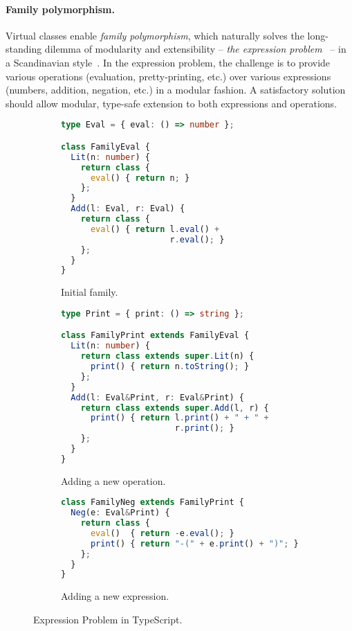 \paragraph{Family polymorphism.}
Virtual classes enable \emph{family polymorphism}, which naturally solves the
long-standing dilemma of modularity and extensibility -- \emph{the expression
problem}~\citep{wadler1998expression} -- in a Scandinavian
style~\citep{ernst2004expression}. In the expression problem, the challenge is
to provide various operations (evaluation, pretty-printing, etc.) over various
expressions (numbers, addition, negation, etc.) in a modular fashion. A
satisfactory solution should allow modular, type-safe extension to both
expressions and operations.

\begin{figure}
\begin{subfigure}{.5\textwidth}
\begin{lstlisting}[language=TypeScript,basicstyle=\ttfamily\footnotesize]
type Eval = { eval: () => number };

class FamilyEval {
  Lit(n: number) {
    return class {
      eval() { return n; }
    };
  }
  Add(l: Eval, r: Eval) {
    return class {
      eval() { return l.eval() +
                      r.eval(); }
    };
  }
}
\end{lstlisting}
\caption{Initial family.}\label{fig:EP_initial}
\end{subfigure}%
\begin{subfigure}{.5\textwidth}
\begin{lstlisting}[language=TypeScript,basicstyle=\ttfamily\footnotesize]
type Print = { print: () => string };

class FamilyPrint extends FamilyEval {
  Lit(n: number) {
    return class extends super.Lit(n) {
      print() { return n.toString(); }
    };
  }
  Add(l: Eval&Print, r: Eval&Print) {
    return class extends super.Add(l, r) {
      print() { return l.print() + " + " +
                       r.print(); }
    };
  }
}
\end{lstlisting}
\caption{Adding a new operation.}\label{fig:EP_operation}
\end{subfigure}
\par\bigskip
\begin{subfigure}{\textwidth}
\begin{lstlisting}[language=TypeScript,xleftmargin=.25\textwidth,basicstyle=\ttfamily\footnotesize]
class FamilyNeg extends FamilyPrint {
  Neg(e: Eval&Print) {
    return class {
      eval()  { return -e.eval(); }
      print() { return "-(" + e.print() + ")"; }
    };
  }
}
\end{lstlisting}
\caption{Adding a new expression.}\label{fig:EP_expression}
\end{subfigure}
\caption{Expression Problem in TypeScript.}
\end{figure}

